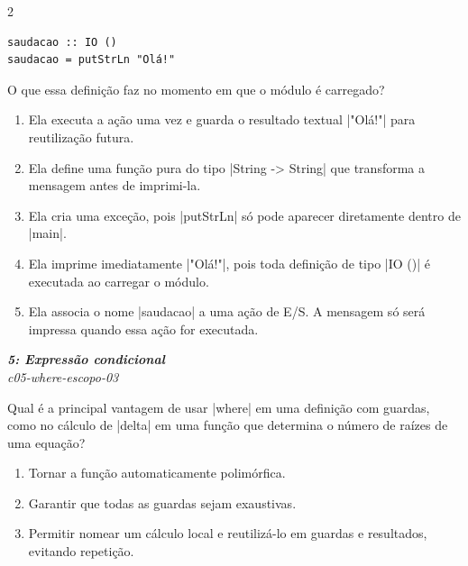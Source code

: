 \documentclass[a4paper,10pt,brazil]{article}
\begin{document}
\begin{multicols}{2}
\begin{verbatim}
saudacao :: IO ()
saudacao = putStrLn "Olá!"
\end{verbatim}

O que essa definição faz no momento em que o módulo é carregado?

\begin{enumerate}
  \item Ela executa a ação uma vez e guarda o resultado textual \haskellinline|"Olá!"| para reutilização futura.

  \item Ela define uma função pura do tipo \haskellinline|String -> String| que transforma a mensagem antes de imprimi-la.

  \item Ela cria uma exceção, pois \haskellinline|putStrLn| só pode aparecer diretamente dentro de \haskellinline|main|.

  \item Ela imprime imediatamente \haskellinline|"Olá!"|, pois toda definição de tipo \haskellinline|IO ()| é executada ao carregar o módulo.

  \item Ela associa o nome \haskellinline|saudacao| a uma ação de E/S. A mensagem só será impressa quando essa ação for executada.


\end{enumerate}

\begin{flushright}
  \footnotesize
  \textit{\textbf{5: Expressão condicional}}\\
  \textit{c05-where-escopo-03}\\

\end{flushright}
Qual é a principal vantagem de usar \haskellinline|where| em uma definição com guardas, como no cálculo de \haskellinline|delta| em uma função que determina o número de raízes de uma equação?

\begin{enumerate}
  \item Tornar a função automaticamente polimórfica.

  \item Garantir que todas as guardas sejam exaustivas.

  \item Permitir nomear um cálculo local e reutilizá-lo em guardas e resultados, evitando repetição.


\end{enumerate}
\end{multicols}
\end{document}
